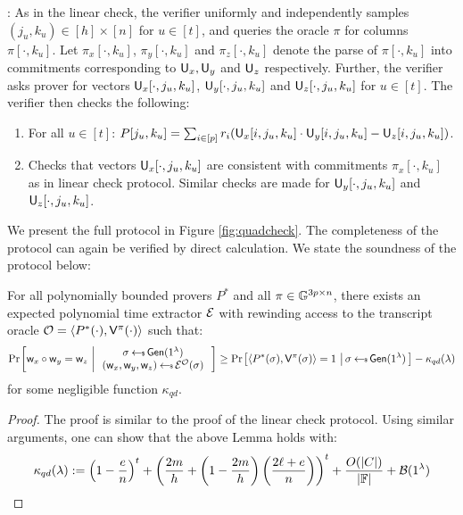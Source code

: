 : As in the linear check, the
verifier uniformly and independently samples $(j_u,k_u)\in [h]\times [n]$ for
$u\in [t]$, and queries the oracle $\pi$ for columns $\pi[\cdot,k_u]$. Let
$\pi_x[\cdot,k_u]$, $\pi_y[\cdot,k_u]$ and $\pi_z[\cdot,k_u]$ denote the parse
of $\pi[\cdot,k_u]$ into commitments corresponding to $\mathsf{U}_x,\mathsf{U}_y$ and
$\mathsf{U}_z$ respectively. Further, the verifier asks prover for vectors
$\mathsf{U}_x[\cdot,j_u,k_u]$, $\mathsf{U}_y[\cdot,j_u,k_u]$ and $\mathsf{U}_z[\cdot,j_u,k_u]$
for $u\in [t]$. The verifier then checks the following:
\begin{enumerate}[{\rm (i)}]
\item For all $u\in [t]$: $P[j_u,k_u]=\sum_{i\in
[p]}r_i(\mathsf{U}_x[i,j_u,k_u]\cdot\mathsf{U}_y[i,j_u,k_u]-\mathsf{U}_z[i,j_u,k_u])$.
\item Checks that vectors $\mathsf{U}_x[\cdot,j_u,k_u]$ are consistent with
commitments $\pi_x[\cdot,k_u]$ as in linear check protocol. Similar checks are
made for $\mathsf{U}_y[\cdot,j_u,k_u]$ and $\mathsf{U}_z[\cdot,j_u,k_u]$.
\end{enumerate}
We present the full protocol in Figure \ref{fig:quadcheck}. The completeness of
the protocol can again be verified by direct calculation. We state the soundness
of the protocol below:
\begin{lemma}[Soundness]\label{lem:quadcheck_sound}
For all polynomially bounded provers $P^\ast$ and all $\pi\in \mathbb{G}^{3p\times n}$,
there exists an expected polynomial time extractor $\mathcal{E}$ with rewinding access
to the transcript oracle $\mathcal{O}=\langle P^\ast(\cdot),\mathsf{V}^{\pi}(\cdot)\rangle$
such that:
\begin{align*}
\condprob{\wit_x\circ\wit_y=\wit_z}{
\begin{array}{c}
\sigma\sample \gen(\secparam) \\
(\wit_x,\wit_y,\wit_z)\sample \extr^{\mc{O}}(\sigma)
\end{array}
}\geq \condprob{\innp{P^\ast(\sigma)}{\verifier^{\pi}(\sigma)}=1}{\sigma\sample
\gen(\secparam)} - \kappa_{qd}(\secpar)
\end{align*}
for some negligible function $\kappa_{qd}$.
\end{lemma}
\begin{proof}
The proof is similar to the proof of the linear check protocol. Using similar
arguments, one can show that the above Lemma holds with:
\begin{equation*}
\kappa_{qd}(\lambda) := \left(1-\frac{e}{n}\right)^t +
\left(\frac{2m}{h}+\left(1-\frac{2m}{h}\right)\left(\frac{2\ell+e}{n}\right)\right)^t
+ \frac{O(|C|)}{|\mathbb{F}|} + \mathcal{B}(1^{\lambda})
\end{equation*}
\end{proof}

